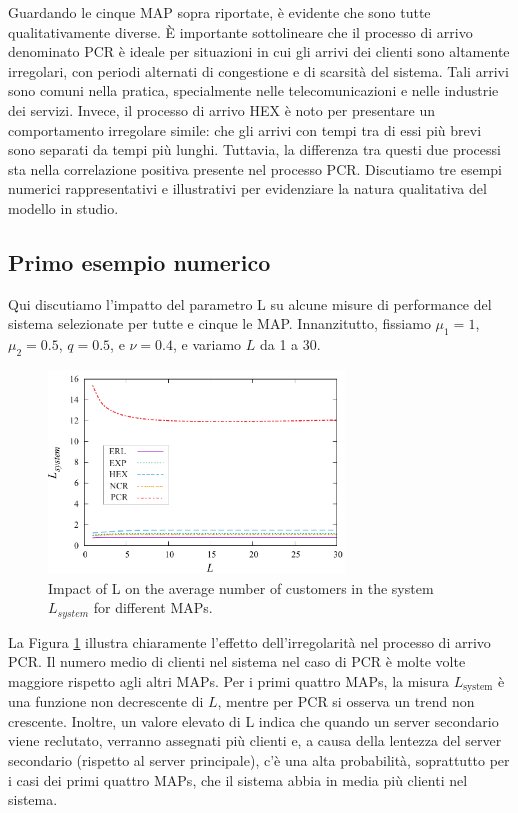\documentclass[11pt]{article}
\begin{document}
Guardando le cinque MAP sopra riportate, è evidente che sono tutte qualitativamente diverse. È importante sottolineare che il processo di arrivo denominato PCR è ideale per situazioni in cui gli arrivi dei clienti sono altamente irregolari, con periodi alternati di congestione e di scarsità del sistema. Tali arrivi sono comuni nella pratica, specialmente nelle telecomunicazioni e nelle industrie dei servizi. Invece, il processo di arrivo HEX è noto per presentare un comportamento irregolare simile: che gli arrivi con tempi tra di essi più brevi sono separati da tempi più lunghi. Tuttavia, la differenza tra questi due processi sta nella correlazione positiva presente nel processo PCR. Discutiamo tre esempi numerici rappresentativi e illustrativi per evidenziare la natura qualitativa del modello in studio.

\subsection{Primo esempio numerico}
Qui discutiamo l'impatto del parametro L su alcune misure di performance del sistema selezionate per tutte e cinque le MAP. Innanzitutto, fissiamo $\mu_1=1$, $\mu_2=0.5$, $q=0.5$, e $\nu=0.4$, e variamo $L$ da 1 a 30.

\begin{figure}[h]
    \centering
    \includegraphics[width=0.7\textwidth]{gtHnIzQ.png}
    \caption{Impact of L on the average number of customers in the system $L_{system}$ for different MAPs.}
    \label{fig:1}
\end{figure}
La Figura \ref{fig:1} illustra chiaramente l'effetto dell'irregolarità nel processo di arrivo PCR. Il numero medio di clienti nel sistema nel caso di PCR è molte volte maggiore rispetto agli altri MAPs. Per i primi quattro MAPs, la misura $L_\text{system}$ è una funzione non decrescente di $L$, mentre per PCR si osserva un trend non crescente. Inoltre, un valore elevato di L indica che quando un server secondario viene reclutato, verranno assegnati più clienti e, a causa della lentezza del server secondario (rispetto al server principale), c'è una alta probabilità, soprattutto per i casi dei primi quattro MAPs, che il sistema abbia in media più clienti nel sistema. \\
\end{document}
